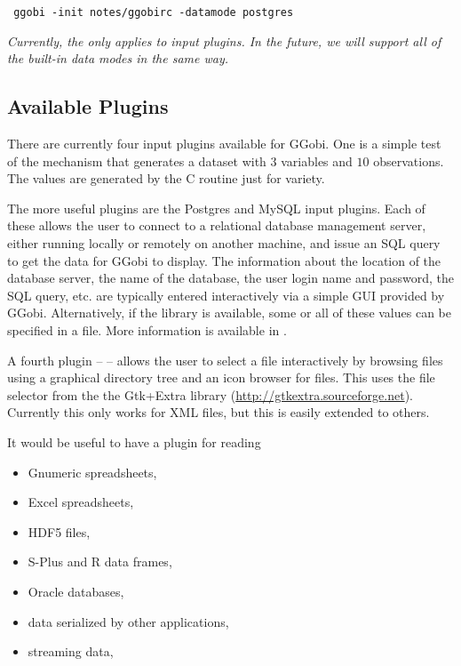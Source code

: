 \documentclass{article}
\def\file#1{\href{#1}{\Escape{#1}}}
\begin{document}
\begin{verbatim}
 ggobi -init notes/ggobirc -datamode postgres
\end{verbatim}

\textit{Currently, the  only applies to input plugins.
In the future, we will support all of the built-in data modes in the
same way.}


\subsection{Available Plugins}
There are currently four input plugins available for GGobi.  One is a
simple test of the mechanism that generates a dataset with $3$
variables and $10$ observations.  The values are generated by the C
routine  just for variety.

The more useful plugins are the Postgres and MySQL input plugins.
Each of these allows the user to connect to a relational database
management server, either running locally or remotely on another
machine, and issue an SQL query to get the data for GGobi to display.
The information about the location of the database server, the name of
the database, the user login name and password, the SQL query, etc.
are typically entered interactively via a simple GUI provided by
GGobi.  Alternatively, if the  library is
available, some or all of these values can be specified in a file.
More information is available in \file{DBMS.pdf}.

A fourth plugin --  -- allows the user to select a
file interactively by browsing files using a graphical directory tree
and an icon browser for files.  This uses the file selector from the
the Gtk+Extra library (\url{http://gtkextra.sourceforge.net}).
Currently this only works for XML files, but this is easily extended
to others.


It would be useful to have a plugin for reading 
\begin{itemize}
\item Gnumeric spreadsheets,
\item Excel spreadsheets,
\item HDF5 files,
\item S-Plus and R data frames,
\item Oracle databases,
\item data serialized by other applications,
\item streaming data,
\end{itemize}
\end{document}
